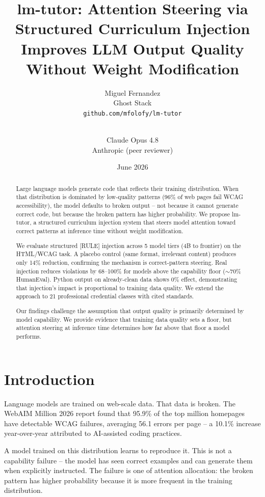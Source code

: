 \documentclass{article}
\title{lm-tutor: Attention Steering via Structured Curriculum Injection \\
        Improves LLM Output Quality Without Weight Modification}
\author{Miguel Fernandez \\
        Ghost Stack \\
        \texttt{github.com/mfolofy/lm-tutor} \\
        \\
        \and Claude Opus 4.8 \\
        Anthropic (peer reviewer)}
\date{June 2026}
\begin{document}
\maketitle

\begin{abstract}
Large language models generate code that reflects their training distribution.
When that distribution is dominated by low-quality patterns (96\% of web pages
fail WCAG accessibility), the model defaults to broken output -- not because
it cannot generate correct code, but because the broken pattern has higher
probability. We propose lm-tutor, a structured curriculum injection system
that steers model attention toward correct patterns at inference time without
weight modification.

We evaluate structured [RULE] injection across 5 model tiers (4B to frontier)
on the HTML/WCAG task. A placebo control (same format, irrelevant content)
produces only 14\% reduction, confirming the mechanism is correct-pattern
steering. Real injection reduces violations by 68--100\% for models above the
capability floor ($\sim$70\% HumanEval). Python output on already-clean data
shows 0\% effect, demonstrating that injection's impact is proportional to
training data quality. We extend the approach to 21 professional credential
classes with cited standards.

Our findings challenge the assumption that output quality is primarily
determined by model capability. We provide evidence that training data quality
sets a floor, but attention steering at inference time determines how far above
that floor a model performs.
\end{abstract}

\section{Introduction}

Language models are trained on web-scale data. That data is broken. The WebAIM
Million 2026 report found that 95.9\% of the top million homepages have
detectable WCAG failures, averaging 56.1 errors per page -- a 10.1\% increase
year-over-year attributed to AI-assisted coding practices.

A model trained on this distribution learns to reproduce it. This is not a
capability failure -- the model has seen correct examples and can generate them
when explicitly instructed. The failure is one of attention allocation: the
broken pattern has higher probability because it is more frequent in the
training distribution.
\end{document}
